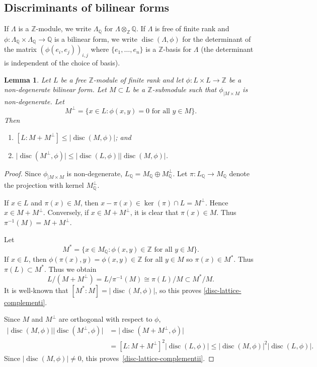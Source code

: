 \documentclass[11pt]{article}
\numberwithin{equation}{section}
\newenvironment{enumeratei}
{\bgroup\def\theenumi{\roman{enumi}}\def\theenumii{\alph{enumii}}\begin{enumerate}}
{\end{enumerate}\egroup}
\newcommand{\bQ}{\mathbb{Q}}
\newcommand{\bZ}{\mathbb{Z}}
\DeclareMathOperator{\disc}{disc}
\newcommand{\abs}[1]{\lvert #1 \rvert}
\newtheorem{lemma}{Lemma}[section]
\begin{document}
\subsection{Discriminants of bilinear forms}

If $\Lambda$ is a $\bZ$-module, we write $\Lambda_\bQ$ for $\Lambda\otimes_\bZ\bQ$. If $\Lambda$ is free of finite rank and $\phi \colon \Lambda_\bQ \times \Lambda_\bQ \to \bQ$ is a bilinear form, we write $\disc(\Lambda,\phi)$ for the determinant of the matrix $(\phi(e_i,e_j))_{i,j}$ where $\{e_1,\ldots,e_n\}$ is a $\bZ$-basis for $\Lambda$ (the determinant is independent of the choice of basis).

\begin{lemma} \label{disc-lattice-complement}
Let $L$ be a free $\bZ$-module of finite rank and let $\phi \colon L \times L \to \bZ$ be a non-degenerate bilinear form.
Let $M \subset L$ be a $\bZ$-submodule such that $\phi_{|M \times M}$ is non-degenerate.
Let
\[
M^\perp = \{ x \in L : \phi(x,y) = 0 \text{ for all } y \in M \}.
\]
Then
\begin{enumeratei}
\item\label{disc-lattice-complementi} $[L : M + M^\perp] \leq \abs{\disc(M, \phi)}$; and
\item\label{disc-lattice-complementii} $\abs{\disc(M^\perp, \phi)} \leq \abs{\disc(L, \phi)} \abs{\disc(M, \phi)}$.
\end{enumeratei}
\end{lemma}

\begin{proof}
Since $\phi_{|M \times M}$ is non-degenerate, $L_\bQ = M_\bQ \oplus M_\bQ^\perp$.
Let $\pi \colon L_\bQ \to M_\bQ$ denote the projection with kernel $M_\bQ^\perp$.

If $x \in L$ and $\pi(x) \in M$, then $x-\pi(x) \in \ker(\pi) \cap L = M^\perp$.
Hence $x \in M + M^\perp$.
Conversely, if $x \in M + M^\perp$, it is clear that $\pi(x) \in M$.
Thus $\pi^{-1}(M) = M + M^\perp$.

Let
\[
M^* = \{ x \in M_\bQ : \phi(x, y) \in \bZ \text{ for all } y \in M \}.
\]
If $x \in L$, then $\phi(\pi(x),y) = \phi(x,y) \in \bZ$ for all $y \in M$ so $\pi(x) \in M^*$.
Thus $\pi(L) \subset M^*$.
Thus we obtain
\[
L/(M + M^\perp) = L/\pi^{-1}(M) \cong \pi(L)/M \subset M^*/M.
\]
It is well-known that $[M^*:M] = \abs{\disc(M,\phi)}$, so this proves \eqref{disc-lattice-complementi}.

Since $M$ and $M^\perp$ are orthogonal with respect to $\phi$,
\begin{align*}
\abs{\disc(M, \phi)} \abs{\disc(M^\perp, \phi)}
& = \abs{\disc(M + M^\perp, \phi)}
\\& = [L:M+M^\perp]^2 \abs{\disc(L, \phi)}
\leq \abs{\disc(M, \phi)}^2 \abs{\disc(L, \phi)}.
\end{align*}
Since $\abs{\disc(M, \phi)} \neq 0$, this proves~\eqref{disc-lattice-complementii}.
\end{proof}
\end{document}
